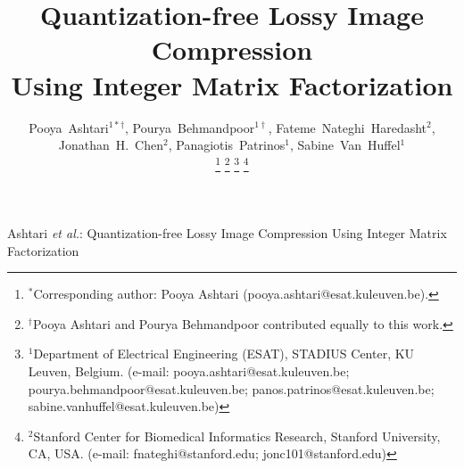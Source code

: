 \documentclass[journal]{IEEEtran}
\begin{document}
\title{Quantization-free Lossy Image Compression\\ Using Integer Matrix Factorization}

\author{
    Pooya~Ashtari$^{1*\dag}$,
    Pourya~Behmandpoor$^{1\dag}$,
    Fateme~Nateghi~Haredasht$^{2}$,
    Jonathan~H.~Chen$^{2}$,
    Panagiotis~Patrinos$^{1}$,
    Sabine~Van~Huffel$^{1}$

    \thanks{$^{*}$Corresponding author: Pooya Ashtari (pooya.ashtari@esat.kuleuven.be).}
    \thanks{$^{\dag}$Pooya Ashtari and Pourya Behmandpoor contributed equally to this work.}
    \thanks{$^{1}$Department of Electrical Engineering (ESAT), STADIUS Center, KU Leuven, Belgium. (e-mail: pooya.ashtari@esat.kuleuven.be; pourya.behmandpoor@esat.kuleuven.be; panos.patrinos@esat.kuleuven.be; sabine.vanhuffel@esat.kuleuven.be)}
    \thanks{$^{2}$Stanford Center for Biomedical Informatics Research, Stanford University, CA, USA. (e-mail: fnateghi@stanford.edu; jonc101@stanford.edu)}
}

%
{Ashtari \MakeLowercase{\textit{et al.}}: Quantization-free Lossy Image Compression Using Integer Matrix Factorization}

\maketitle












\appendices


\printbibliography



\end{document}
